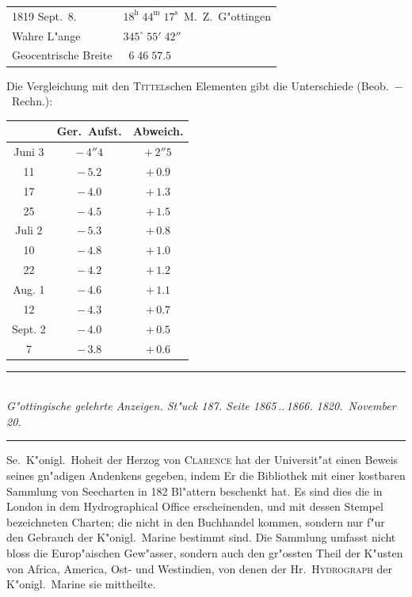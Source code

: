 \documentclass[12pt,a4paper]{article}
\begin{document}
\begin{center}
\begin{tabular}{l@{\quad}l}
1819 Sept.~8. & $18^{\mathrm{h}}\;44^{\mathrm{m}}\;17^{\mathrm{s}}$~M.~Z.~G"ottingen \\
Wahre L"ange \dotfill & $345^{\circ}\;55'\;42''$ \\
Geocentrische Breite \dotfill & $\phantom{0}6\;46\;57.5$ \\
\end{tabular}
\end{center}

Die Vergleichung mit den \textsc{Tittel}schen Elementen gibt die Unterschiede (Beob.~$-$~Rechn.):

\begin{center}
\small
\begin{tabular}{c|c|c}
\toprule
& Ger.~Aufst. & Abweich. \\
\midrule
Juni \phantom{0}3 & $-\,4''4$ & $+\,2''5$ \\
\phantom{0}\phantom{0} 11 & $-\,5.2$ & $+\,0.9$ \\
\phantom{0}\phantom{0} 17 & $-\,4.0$ & $+\,1.3$ \\
\phantom{0}\phantom{0} 25 & $-\,4.5$ & $+\,1.5$ \\
Juli \phantom{0}2 & $-\,5.3$ & $+\,0.8$ \\
\phantom{0}\phantom{0} 10 & $-\,4.8$ & $+\,1.0$ \\
\phantom{0}\phantom{0} 22 & $-\,4.2$ & $+\,1.2$ \\
Aug. \phantom{0}1 & $-\,4.6$ & $+\,1.1$ \\
\phantom{0}\phantom{0} 12 & $-\,4.3$ & $+\,0.7$ \\
Sept. \phantom{0}2 & $-\,4.0$ & $+\,0.5$ \\
\phantom{0}\phantom{0} \phantom{0}7 & $-\,3.8$ & $+\,0.6$ \\
\bottomrule
\end{tabular}
\end{center}

\vspace{1em}

\begin{center}
\rule{0.6\textwidth}{0.4pt}\\[0.5em]
\textit{G"ottingische gelehrte Anzeigen. St"uck 187. Seite 1865\,..\,1866. 1820.~November 20.}\\[0.3em]
\rule{0.6\textwidth}{0.4pt}
\end{center}

Se.~K"onigl.~Hoheit der Herzog von \textsc{Clarence} hat der Universit"at einen Beweis seines gn"adigen
Andenkens gegeben, indem Er die Bibliothek mit einer kostbaren Sammlung von Seecharten in 182
Bl"attern beschenkt hat. Es sind dies die in London in dem Hydrographical Office erscheinenden, und
mit dessen Stempel bezeichneten Charten; die nicht in den Buchhandel kommen, sondern nur f"ur den
Gebrauch der K"onigl.~Marine bestimmt sind. Die Sammlung umfasst nicht bloss die Europ"aischen
Gew"asser, sondern auch den gr"ossten Theil der K"usten von Africa, America, Ost- und Westindien, von
denen der H\kern-0.5pt{}r.~\textsc{Hydrograph}\kern-0.5pt{} der K"onigl.~Marine sie mittheilte.
\end{document}
